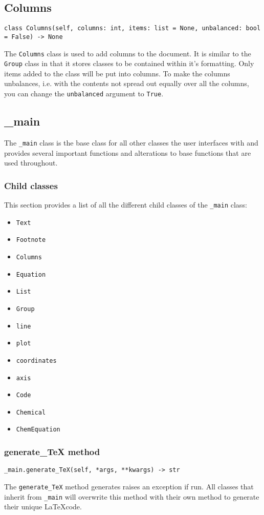 \documentclass{article}
\begin{document}
\subsection[Columns]{Columns}
\lstset{language=Python}
\begin{lstlisting}
class Columns(self, columns: int, items: list = None, unbalanced: bool = False) -> None
\end{lstlisting}
The \verb|Columns| class is used to add columns to the document. It is similar to the \verb|Group| class in that it stores classes to be contained within it's formatting. Only items added to the class will be put into columns. To make the columns unbalances, i.e. with the contents not spread out equally over all the columns, you can change the \verb|unbalanced| argument to \verb|True|.
\subsection[\_main]{\_main}
The \verb|_main| class is the base class for all other classes the user interfaces with and provides several important functions and alterations to base functions that are used throughout.
\subsubsection[Child classes]{Child classes}
This section provides a list of all the different child classes of the \verb|_main| class:\begin{multicols}{2}\begin{itemize}
\item \verb|Text|
\item \verb|Footnote|
\item \verb|Columns|
\item \verb|Equation|
\item \verb|List|
\item \verb|Group|
\item \verb|line|
\item \verb|plot|
\item \verb|coordinates|
\item \verb|axis|
\item \verb|Code|
\item \verb|Chemical|
\item \verb|ChemEquation|
\end{itemize}
\end{multicols}
\subsubsection[generate\_TeX method]{generate\_TeX method}
\lstset{language=python}
\begin{lstlisting}
_main.generate_TeX(self, *args, **kwargs) -> str
\end{lstlisting}
The \verb|generate_TeX| method generates raises an exception if run. All classes that inherit from \verb|_main| will overwrite this method with their own method to generate their unique \LaTeX  code.
\end{document}
